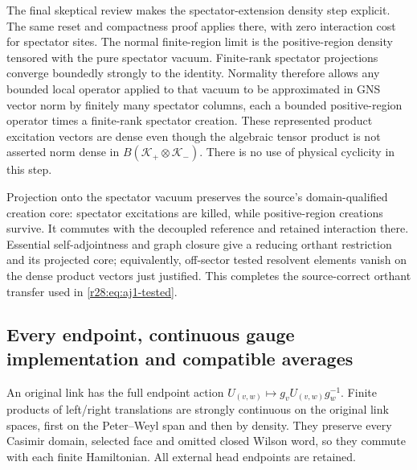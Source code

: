 The final skeptical review makes the spectator-extension density step explicit. The same reset and compactness proof applies there, with zero interaction cost for spectator sites. The normal finite-region limit is the positive-region density tensored with the pure spectator vacuum. Finite-rank spectator projections converge boundedly strongly to the identity. Normality therefore allows any bounded local operator applied to that vacuum to be approximated in GNS vector norm by finitely many spectator columns, each a bounded positive-region operator times a finite-rank spectator creation. These represented product excitation vectors are dense even though the algebraic tensor product is not asserted norm dense in $B(\mathcal K_+\otimes\mathcal K_-)$. There is no use of physical cyclicity in this step.

Projection onto the spectator vacuum preserves the source's domain-qualified creation core: spectator excitations are killed, while positive-region creations survive. It commutes with the decoupled reference and retained interaction there. Essential self-adjointness and graph closure give a reducing orthant restriction and its projected core; equivalently, off-sector tested resolvent elements vanish on the dense product vectors just justified. This completes the source-correct orthant transfer used in \eqref{r28:eq:aj1-tested}.

\subsection{Every endpoint, continuous gauge implementation and compatible averages}
An original link has the full endpoint action $U_{(v,w)}\mapsto g_vU_{(v,w)}g_w^{-1}$. Finite products of left/right translations are strongly continuous on the original link spaces, first on the Peter--Weyl span and then by density. They preserve every Casimir domain, selected face and omitted closed Wilson word, so they commute with each finite Hamiltonian. All external head endpoints are retained.

